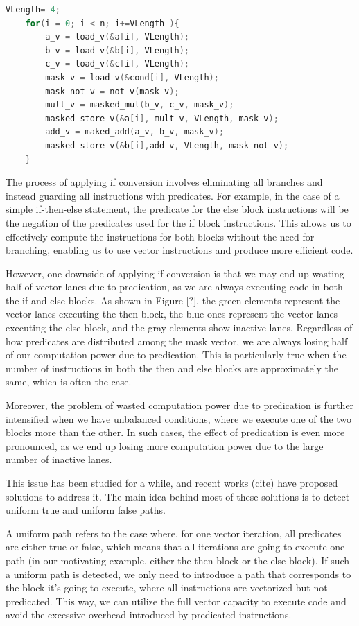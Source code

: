 \documentclass[\main/thesis.tex]{subfiles}
\begin{document}
\begin{lstlisting}[language=C]
    VLength= 4;
    for(i = 0; i < n; i+=VLength ){
        a_v = load_v(&a[i], VLength);
        b_v = load_v(&b[i], VLength);
        c_v = load_v(&c[i], VLength);
        mask_v = load_v(&cond[i], VLength);
        mask_not_v = not_v(mask_v);
        mult_v = masked_mul(b_v, c_v, mask_v);
        masked_store_v(&a[i], mult_v, VLength, mask_v);
        add_v = maked_add(a_v, b_v, mask_v);
        masked_store_v(&b[i],add_v, VLength, mask_not_v);
    }
\end{lstlisting}

The process of applying if conversion involves eliminating all branches and instead guarding all instructions with predicates. For example, in the case of a simple if-then-else statement, the predicate for the else block instructions will be the negation of the predicates used for the if block instructions. This allows us to effectively compute the instructions for both blocks without the need for branching, enabling us to use vector instructions and produce more efficient code.

However, one downside of applying if conversion is that we may end up wasting half of vector lanes due to predication, as we are always executing code in both the if and else blocks. As shown in Figure [?], the green elements represent the vector lanes executing the then block, the blue ones represent the vector lanes executing the else block, and the gray elements show inactive lanes. Regardless of how predicates are distributed among the mask vector, we are always losing half of our computation power due to predication. This is particularly true when the number of instructions in both the then and else blocks are approximately the same, which is often the case.

Moreover, the problem of wasted computation power due to predication is further intensified when we have unbalanced conditions, where we execute one of the two blocks more than the other. In such cases, the effect of predication is even more pronounced, as we end up losing more computation power due to the large number of inactive lanes.

This issue has been studied for a while, and recent works (cite) have proposed solutions to address it. The main idea behind most of these solutions is to detect uniform true and uniform false paths.

A uniform path refers to the case where, for one vector iteration, all predicates are either true or false, which means that all iterations are going to execute one path (in our motivating example, either the then block or the else block). If such a uniform path is detected, we only need to introduce a path that corresponds to the block it's going to execute, where all instructions are vectorized but not predicated. This way, we can utilize the full vector capacity to execute code and avoid the excessive overhead introduced by predicated instructions.
\end{document}
